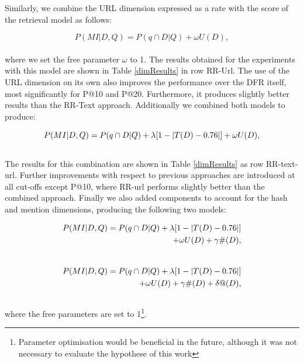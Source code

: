 Similarly, we combine the URL dimension expressed as a rate with the score of the retrieval model as follows:

\begin{equation}
P(MI|D,Q) = P(q \cap D|Q) + \omega U(D),
\label{eqUrl}
\end{equation}\\

\noindent where we set the free parameter \(\omega\) to 1. The results obtained for the experiments with this model are shown in Table \ref{dimResults} in row RR-Url. The use of the URL dimension on its own also improves the performance over the DFR itself, most significantly for P@10 and P@20. Furthermore, it produces slightly better results than the RR-Text approach. Additionally we combined both models to produce: 

\begin{equation}
P(MI|D,Q) = P(q \cap D|Q) + \lambda [1- \abs{T(D)-0.76}] + \omega U(D),
\label{eqComb}
\end{equation}\\

The results for this combination are shown in Table \ref{dimResults} as row RR-text-url. Further improvements with respect to previous approaches are introduced at all cut-offs except P@10, where RR-url performs slightly better than the combined approach. Finally we also added components to account for the hash and mention dimensions, producing the following two models:

\begin{equation}
\begin{split}
P(MI|D,Q) = P(q \cap D|Q) + \lambda [1- \abs{T(D)-0.76}] \\
 + \omega U(D) + \gamma \#(D),
\end{split}
\label{eqHash}
\end{equation}\\

\begin{equation}
\begin{split}
P(MI|D,Q) = P(q \cap D|Q) + \lambda [1- \abs{T(D)-0.76}] \\
 + \omega U(D) + \gamma \#(D) + \delta @(D),
\end{split}
\label{eqMent}
\end{equation}\\

\noindent where the free parameters are set to 1\footnote{Parameter optimisation would be beneficial in the future, although it was not necessary to evaluate the hypothese of this work}.

